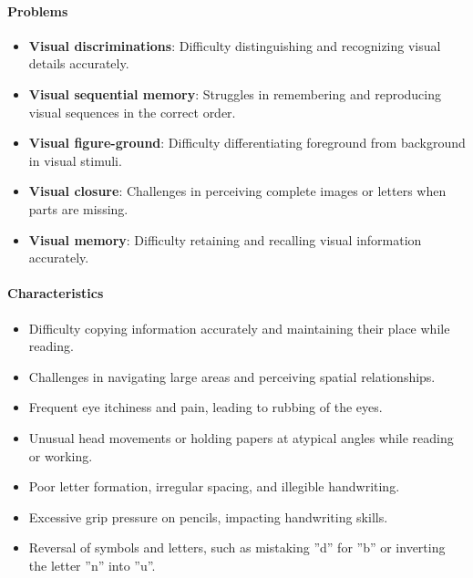 \paragraph{Problems}
\begin{itemize}
    \item \textbf{Visual discriminations}: Difficulty distinguishing and recognizing visual details accurately.
    \item \textbf{Visual sequential memory}: Struggles in remembering and reproducing visual sequences in the correct order.
    \item \textbf{Visual figure-ground}: Difficulty differentiating foreground from background in visual stimuli.
    \item \textbf{Visual closure}: Challenges in perceiving complete images or letters when parts are missing.
    \item \textbf{Visual memory}: Difficulty retaining and recalling visual information accurately.
\end{itemize}

\paragraph{Characteristics}
\begin{itemize}
    \item Difficulty copying information accurately and maintaining their place while reading.
    \item Challenges in navigating large areas and perceiving spatial relationships.
    \item Frequent eye itchiness and pain, leading to rubbing of the eyes.
    \item Unusual head movements or holding papers at atypical angles while reading or working.
    \item Poor letter formation, irregular spacing, and illegible handwriting.
    \item Excessive grip pressure on pencils, impacting handwriting skills.
    \item Reversal of symbols and letters, such as mistaking ''d'' for ''b'' or inverting the letter ''n'' into ''u''.
\end{itemize}

